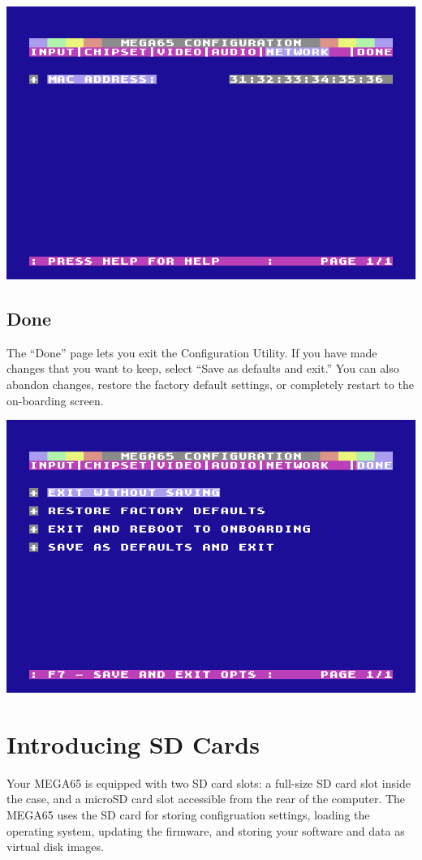 \begin{center}
  \includegraphics[width=0.7\linewidth]{images/ss-m65config-5.png}
\end{center}

\subsection{Done}

The ``Done'' page lets you exit the Configuration Utility. If you have made changes that you want to keep, select ``Save as defaults and exit.'' You can also abandon changes, restore the factory default settings, or completely restart to the on-boarding screen.

\begin{center}
  \includegraphics[width=0.7\linewidth]{images/ss-m65config-save.png}
\end{center}


\section{Introducing SD Cards}
\label{sec:introducing-sd-cards}

Your MEGA65 is equipped with two SD card slots: a full-size SD card slot inside the case, and a microSD card slot accessible from the rear of the computer. The MEGA65 uses the SD card for storing configruation settings, loading the operating system, updating the firmware, and storing your software and data as virtual disk images.

